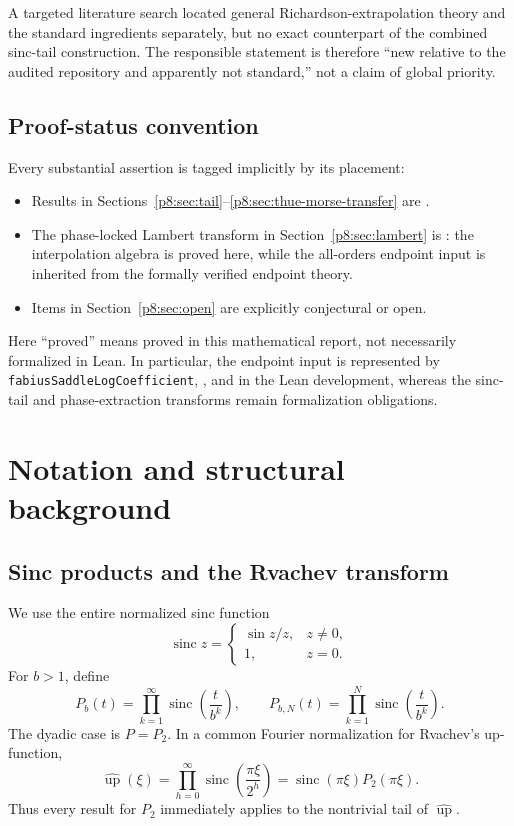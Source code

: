 \documentclass[11pt]{article}
\numberwithin{equation}{section}
\theoremstyle{definition}
\theoremstyle{remark}
\newcommand{\Up}{\operatorname{up}}
\newcommand{\sinc}{\operatorname{sinc}}
\begin{document}
A targeted literature search located general Richardson-extrapolation theory and the standard ingredients separately, but no exact counterpart of the combined sinc-tail construction. The responsible statement is therefore ``new relative to the audited repository and apparently not standard,'' not a claim of global priority.

\subsection{Proof-status convention}

Every substantial assertion is tagged implicitly by its placement:
\begin{itemize}
\item Results in Sections~\ref{p8:sec:tail}--\ref{p8:sec:thue-morse-transfer} are \statusprovedPartll.
\item The phase-locked Lambert transform in Section~\ref{p8:sec:lambert} is \statusconditional:
the interpolation algebra is proved here, while the all-orders endpoint input is inherited
from the formally verified endpoint theory.
\item Items in Section~\ref{p8:sec:open} are explicitly conjectural or open.
\end{itemize}
Here ``proved'' means proved in this mathematical report, not necessarily formalized in
Lean.  In particular, the endpoint input is represented by
\texttt{fabiusSaddleLogCoefficient},
, and
 in the Lean development,
whereas the sinc-tail and phase-extraction transforms remain formalization obligations.

\section{Notation and structural background}
\label{p8:sec:notation}

\subsection{Sinc products and the Rvachev transform}

We use the entire normalized sinc function
\[
\sinc z=\begin{cases}\sin z/z,&z\ne0,\\1,&z=0.\end{cases}
\]
For $b>1$, define
\begin{equation}
P_b(t)=\prod_{k=1}^{\infty}\sinc\!\left(\frac{t}{b^k}\right),
\qquad
P_{b,N}(t)=\prod_{k=1}^{N}\sinc\!\left(\frac{t}{b^k}\right).
\label{p8:eq:Pb-def}
\end{equation}
The dyadic case is $P=P_2$. In a common Fourier normalization for Rvachev's up-function,
\begin{equation}
\widehat{\Up}(\xi)=\prod_{h=0}^{\infty}\sinc\!\left(\frac{\pi\xi}{2^h}\right)
=\sinc(\pi\xi)P_2(\pi\xi).
\label{p8:eq:up-factor}
\end{equation}
Thus every result for $P_2$ immediately applies to the nontrivial tail of $\widehat{\Up}$.
\end{document}
